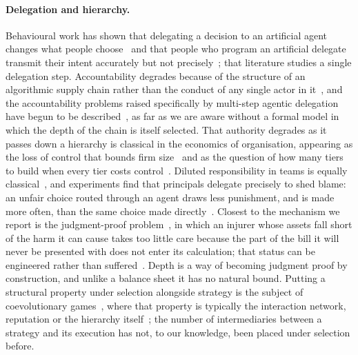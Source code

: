 \documentclass[a4paper,fleqn]{cas-sc}
\begin{document}
\paragraph{Delegation and hierarchy.}
Behavioural work has shown that delegating a decision to an artificial agent
changes what people choose~\citep{domingos2022delegation} and that people who
program an artificial delegate transmit their intent accurately but not
precisely~\citep{terrucha2025delegates}; that literature studies a single
delegation step. Accountability degrades because of the structure of an
algorithmic supply chain rather than the conduct of any single actor in
it~\citep{cobbe2023supply}, and the accountability problems raised specifically
by multi-step agentic delegation have begun to be
described~\citep{hammond2025multiagent,tomasev2026delegation,gabison2025liability},
as far as we are aware without a formal model in which the depth of the chain
is itself selected. That authority degrades as it passes down a hierarchy is
classical in the economics of organisation, appearing as the loss of control
that bounds firm
size~\citep{williamson1967hierarchical,calvo1978supervision,radner1993organization}
and as the question of how many tiers to build when every tier costs
control~\citep{garicano2000hierarchies,mcafee1995diseconomies}. Diluted
responsibility in teams is equally classical~\citep{holmstrom1982moral}, and
experiments find that principals delegate precisely to shed blame: an unfair
choice routed through an agent draws less punishment, and is made more often,
than the same choice made directly~\citep{bartling2012shifting,hamman2010selfinterest}.
Closest to the mechanism we report is the judgment-proof
problem~\citep{shavell1986judgment}, in which an injurer whose assets fall
short of the harm it can cause takes too little care because the part of the
bill it will never be presented with does not enter its calculation; that
status can be engineered rather than suffered~\citep{che2008strategic}. Depth
is a way of becoming judgment proof by construction, and unlike a balance sheet
it has no natural bound. Putting a structural property under selection
alongside strategy is the subject of coevolutionary
games~\citep{perc2010coevolutionary}, where that property is typically the
interaction network, reputation or the hierarchy
itself~\citep{perret2020hierarchy}; the number of intermediaries between a
strategy and its execution has not, to our knowledge, been placed under
selection before.
\end{document}
